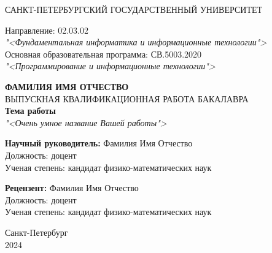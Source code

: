 \thispagestyle{empty}

\begin{center}
    САНКТ-ПЕТЕРБУРГСКИЙ ГОСУДАРСТВЕННЫЙ УНИВЕРСИТЕТ \\
\end{center}
\begin{flushleft}
\vspace{20pt}
    Направление: 02.03.02 \\
    \textit{"<Фундаментальная информатика и информационные технологии">} \\
\vspace{20pt}
    Основная образовательная программа: СВ.5003.2020 \\
    \textit{"<Программирование и информационные технологии">}
\end{flushleft}
    



\vfill

\begin{center}
    \textbf{ФАМИЛИЯ ИМЯ ОТЧЕСТВО} \\ 
    \vspace{12pt}
    ВЫПУСКНАЯ КВАЛИФИКАЦИОННАЯ РАБОТА БАКАЛАВРА \\  
    \vspace{20pt}
    \textbf{Тема работы} \\
    \textit{"<Очень умное название Вашей работы">}

    \vspace{20pt}

\end{center}

\vfill

    \noindent \textbf{Научный руководитель:} \hfill  Фамилия Имя Отчество \\ 
    Должность: \hfill доцент \\
    Ученая степень: \hfill кандидат физико-математических наук

    \vspace{20pt}
    
    \noindent \textbf{Рецензент:} \hfill Фамилия Имя Отчество \\
    Должность: \hfill доцент \\
    Ученая степень: \hfill кандидат физико-математических наук

\vfill

\begin{center}
    Санкт-Петербург \\ 2024
\end{center}
